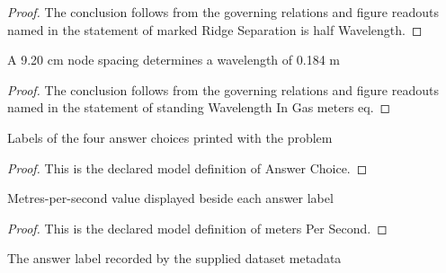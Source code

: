 \begin{proof}
  The conclusion follows from the governing relations and figure readouts named in the statement of marked Ridge Separation is half Wavelength.
\end{proof}
\begin{lemma}
  \label{lem:physics:phyx-mini-0328:phyxminiproblems-problemphyxmini0328-standingwavelengthingas-meters-eq}
  A 9.20 cm node spacing determines a wavelength of 0.184 m
\end{lemma}
\begin{proof}
  The conclusion follows from the governing relations and figure readouts named in the statement of standing Wavelength In Gas meters eq.
\end{proof}
\begin{definition}
  \label{def:physics:phyx-mini-0328:phyxminiproblems-problemphyxmini0328-answerchoice}
  Labels of the four answer choices printed with the problem
\end{definition}
\begin{proof}
  This is the declared model definition of Answer Choice.
\end{proof}
\begin{definition}
  \label{def:physics:phyx-mini-0328:phyxminiproblems-problemphyxmini0328-answerchoice-meterspersecond}
  Metres-per-second value displayed beside each answer label
\end{definition}
\begin{proof}
  This is the declared model definition of meters Per Second.
\end{proof}
\begin{definition}
  \label{def:physics:phyx-mini-0328:phyxminiproblems-problemphyxmini0328-recordeddatasetanswer}
  The answer label recorded by the supplied dataset metadata
\end{definition}
